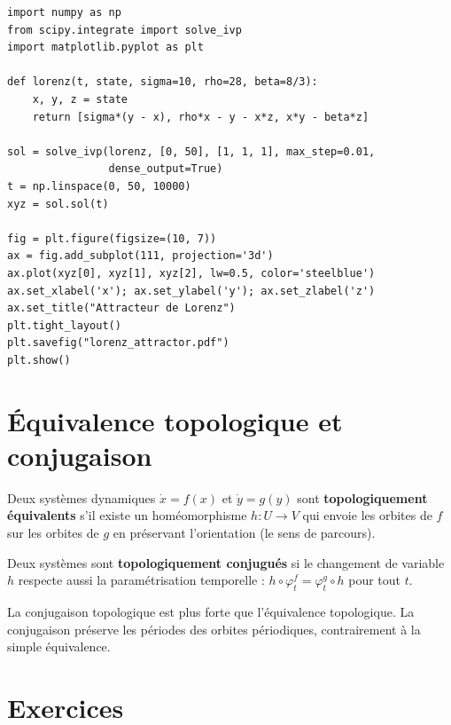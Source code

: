 \begin{codeblock}[title=\textbf{Simulation du syst\`eme de Lorenz}]
\begin{verbatim}
import numpy as np
from scipy.integrate import solve_ivp
import matplotlib.pyplot as plt

def lorenz(t, state, sigma=10, rho=28, beta=8/3):
    x, y, z = state
    return [sigma*(y - x), rho*x - y - x*z, x*y - beta*z]

sol = solve_ivp(lorenz, [0, 50], [1, 1, 1], max_step=0.01,
                dense_output=True)
t = np.linspace(0, 50, 10000)
xyz = sol.sol(t)

fig = plt.figure(figsize=(10, 7))
ax = fig.add_subplot(111, projection='3d')
ax.plot(xyz[0], xyz[1], xyz[2], lw=0.5, color='steelblue')
ax.set_xlabel('x'); ax.set_ylabel('y'); ax.set_zlabel('z')
ax.set_title("Attracteur de Lorenz")
plt.tight_layout()
plt.savefig("lorenz_attractor.pdf")
plt.show()
\end{verbatim}
\end{codeblock}

\section{\'Equivalence topologique et conjugaison}

\begin{definition}
Deux syst\`emes dynamiques $\dot{x} = f(x)$ et $\dot{y} = g(y)$ sont
\textbf{topologiquement \'equivalents} s'il existe un hom\'eomorphisme
$h : U \to V$ qui envoie les orbites de $f$ sur les orbites de $g$
en pr\'eservant l'orientation (le sens de parcours).
\end{definition}

\begin{definition}
Deux syst\`emes sont \textbf{topologiquement conjugu\'es} si le
changement de variable $h$ respecte aussi la param\'etrisation temporelle :
$h \circ \varphi_t^f = \varphi_t^g \circ h$ pour tout $t$.
\end{definition}

\begin{remarque}
La conjugaison topologique est plus forte que l'\'equivalence topologique.
La conjugaison pr\'eserve les p\'eriodes des orbites p\'eriodiques,
contrairement \`a la simple \'equivalence.
\end{remarque}

\section{Exercices}


